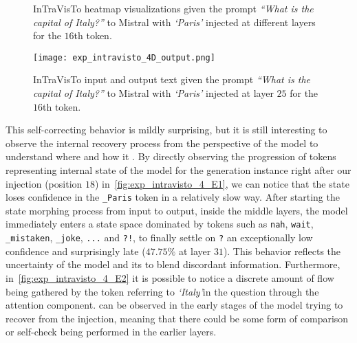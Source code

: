 \begin{figure}[tp!]
    \centering
    \quad
    \caption{InTraVisTo heatmap visualizations given the prompt \emph{``What is the capital of Italy?''} to Mistral with \emph{`Paris'} injected at different layers for the $16$th token.}
    \label{fig:exp_intravisto_4_D}
\end{figure}

\begin{figure}[tp!]
    \centering
    \texttt{[image: exp\_intravisto\_4D\_output.png]}
    \caption{InTraVisTo input and output text given the prompt \emph{``What is the capital of Italy?''} to Mistral with \emph{`Paris'} injected at layer $25$ for the $16$th token.}
    \label{fig:exp_intravisto_4_D3}
\end{figure}

This self-correcting behavior is mildly surprising, but it is still interesting to observe the internal recovery process from the perspective of the model to understand where and how it .
By directly observing the progression of tokens representing internal state of the model for the generation instance right after our injection (position $18$) in~\cref{fig:exp_intravisto_4_E1}, we can notice that the state loses confidence in the \texttt{\_Paris} token in a relatively slow way.
After starting the state morphing process from input to output, inside the middle layers, the model immediately enters a state space dominated by tokens such as \texttt{nah}, \texttt{wait}, \texttt{\_mistaken}, \texttt{\_joke}, \texttt{...} and \texttt{?!}, to finally settle on \texttt{?}  an exceptionally low confidence and surprisingly late ($47.75\%$ at layer $31$). %
This behavior reflects the uncertainty of the model and its  to blend discordant information.
Furthermore, in~\cref{fig:exp_intravisto_4_E2} it is possible to notice a discrete amount of flow being gathered by the token referring to \emph{`Italy'}in the question through the attention component.
 can be observed in the early stages of the model trying to recover from the injection, meaning that there could be some form of comparison or self-check being performed in the earlier layers.

